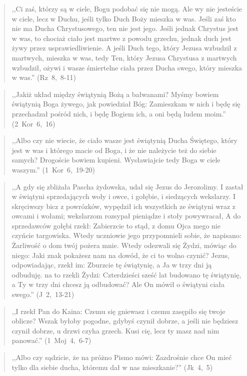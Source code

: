 \documentclass[10pt,a4paper,oneside]{article}
\begin{document}
\begin{quote}
,,Ci zaś, którzy są w ciele, Bogu podobać się nie mogą. Ale wy nie jesteście w ciele, lecz w Duchu, jeśli tylko Duch Boży mieszka w was. Jeśli zaś kto nie ma Ducha Chrystusowego, ten nie jest jego. Jeśli jednak Chrystus jest w was, to chociaż ciało jest martwe z powodu grzechu, jednak duch jest żywy przez usprawiedliwienie. A jeśli Duch tego, który Jezusa wzbudził z martwych, mieszka w was, tedy Ten, który Jezusa Chrystusa z martwych wzbudził, ożywi i wasze śmiertelne ciała przez Ducha swego, który mieszka w was.'' (Rz~8,~8-11)
\end{quote}
\begin{quote}
,,Jakiż układ między świątynią Bożą a bałwanami? Myśmy bowiem świątynią Boga żywego, jak powiedział Bóg: Zamieszkam w nich i będę się przechadzał pośród nich, i będę Bogiem ich, a oni będą ludem moim.'' (2~Kor~6,~16)
\end{quote}
\begin{quote}
,,Albo czy nie wiecie, że ciało wasze jest świątynią Ducha Świętego, który jest w was i którego macie od Boga, i że nie należycie też do siebie samych? Drogoście bowiem kupieni. Wysławiajcie tedy Boga w ciele waszym.'' (1~Kor~6,~19-20)
\end{quote}
\begin{quote}
,,A gdy się zbliżała Pascha żydowska, udał się Jezus do Jerozolimy. I zastał w świątyni sprzedających woły i owce, i gołębie, i siedzących wekslarzy. I skręciwszy bicz z powrózków, wypędził ich wszystkich ze świątyni wraz z owcami i wołami; wekslarzom rozsypał pieniądze i stoły powywracał, A do sprzedawców gołębi rzekł: Zabierzcie to stąd, z domu Ojca mego nie czyńcie targowiska. Wtedy uczniowie jego przypomnieli sobie, że napisano: Żarliwość o dom twój pożera mnie. Wtedy odezwali się Żydzi, mówiąc do niego: Jaki znak pokażesz nam na dowód, że ci to wolno czynić? Jezus, odpowiadając, rzekł im: Zburzcie tę świątynię, a Ja w trzy dni ją odbuduję. na to rzekli Żydzi: Czterdzieści sześć lat budowano tę świątynię, a Ty w trzy dni chcesz ją odbudować? Ale On mówił o świątyni ciała swego.'' (J~2,~13-21)
\end{quote}
\begin{quote}
,,I rzekł Pan do Kaina: Czemu się gniewasz i czemu zasępiło się twoje oblicze? Wszak byłoby pogodne, gdybyś czynił dobrze, a jeśli nie będziesz czynił dobrze, u drzwi czyha grzech. Kusi cię, lecz ty masz nad nim panować.'' (1~Moj~4,~6-7)
\end{quote}
\begin{quote}
,,Albo czy sądzicie, że na próżno Pismo mówi: Zazdrośnie chce On mieć tylko dla siebie ducha, któremu dał w nas mieszkanie?'' (Jk~4,~5)
\end{quote}
\end{document}
